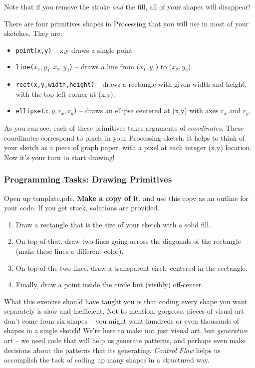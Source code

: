 Note that if you remove the stroke \emph{and} the fill, all of your shapes will disappear!

There are four primitives shapes in Processing that you will use in most of your sketches.  They are:

\begin{itemize}
\item \texttt{point(x,y)} -- x,y draws a single point
\item \texttt{line($x_{1},y_{1},x_{2},y_{2}$)} -- draws a line from ($x_{1},y_{1}$) to ($x_{2},y_{2}$).
\item \texttt{rect(x,y,width,height)} -- draws a rectangle with given width and height, with the top-left corner at (x,y).
\item \texttt{ellipse($x,y,r_{x},r_{y}$)} -- draws an ellipse centered at (x,y) with axes $r_{x}$ and $r_{y}$.
\end{itemize}

As you can see, each of these primitives takes arguments of \emph{coordinates}.  These coordinates correspond to pixels in your Processing sketch.  It helps to think of your sketch as a piece of graph paper, with a pixel at each integer (x,y) location.  Now it's your turn to start drawing!

\subsubsection{Programming Tasks: Drawing Primitives}
Open up template.pde.  \textbf{Make a copy of it}, and use this copy as an outline for your code.  If you get stuck, solutions are provided.

\begin{enumerate}
\item Draw a rectangle that is the size of your sketch with a solid fill.
\item On top of that, draw two lines going across the diagonals of the rectangle (make these lines a different color).
\item On top of the two lines, draw a transparent circle centered in the rectangle.
\item Finally, draw a point inside the circle but (visibly) off-center.
\end{enumerate}

What this exercise should have taught you is that coding every shape you want separately is slow and inefficient.  Not to mention, gorgeous pieces of visual art don't come from six shapes -- you might want hundreds or even thousands of shapes in a single sketch!  We're here to make not just visual art, but \emph{generative} art -- we need code that will help us generate patterns, and perhaps even make decisions about the patterns that its generating.  \emph{Control Flow} helps us accomplish the task of coding up many shapes in a structured way.

